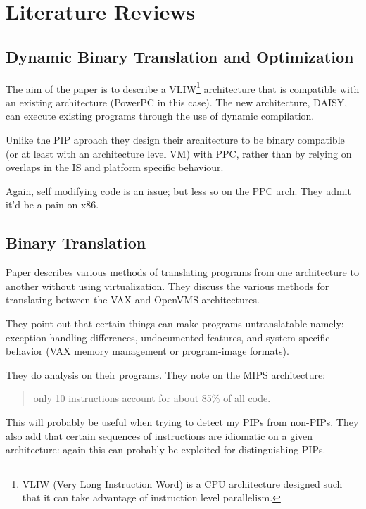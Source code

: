 \chapter{Literature Reviews}

\section{Dynamic Binary Translation and
Optimization\citep{Ebcioglu2001}}

The aim of the paper is to describe a VLIW\footnote{VLIW (Very Long
  Instruction Word) is a CPU architecture designed such that it can take
  advantage of instruction level parallelism.} architecture that is
compatible with an existing architecture (PowerPC in this case). The new
architecture, DAISY, can execute existing programs through the use of
dynamic compilation.

Unlike the PIP aproach they design their architecture to be binary
compatible (or at least with an architecture level VM) with PPC, rather
than by relying on overlaps in the IS and platform specific behaviour.

Again, self modifying code is an issue; but less so on the PPC arch.
They admit it'd be a pain on x86.

\section{Binary Translation\citep{Sites1993}}

Paper describes various methods of translating programs from one
architecture to another without using virtualization. They discuss the
various methods for translating between the VAX and OpenVMS
architectures.

They point out that certain things can make programs untranslatable
namely: exception handling differences, undocumented features, and
system specific behavior (VAX memory management or program-image
formats).

They do analysis on their programs. They note on the MIPS architecture:

\begin{quote}
only 10 instructions account for about 85\% of all code.

\end{quote}
This will probably be useful when trying to detect my PIPs from
non-PIPs. They also add that certain sequences of instructions are
idiomatic on a given architecture: again this can probably be exploited
for distinguishing PIPs.


